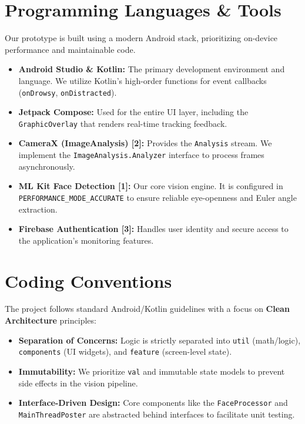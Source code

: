 \documentclass[11pt]{report}
\begin{document}
\section{Programming Languages \& Tools}\label{sec:prog-tools}

Our prototype is built using a modern Android stack, prioritizing on-device performance and maintainable code.

\begin{itemize}
    \item \textbf{Android Studio \& Kotlin:} The primary development environment and language. We utilize Kotlin's high-order functions for event callbacks (\texttt{onDrowsy}, \texttt{onDistracted}).
    \item \textbf{Jetpack Compose:} Used for the entire UI layer, including the \texttt{GraphicOverlay} that renders real-time tracking feedback.
    \item \textbf{CameraX (ImageAnalysis) [2]:} Provides the \texttt{Analysis} stream. We implement the \texttt{ImageAnalysis.Analyzer} interface to process frames asynchronously.
    \item \textbf{ML Kit Face Detection [1]:} Our core vision engine. It is configured in \texttt{PERFORMANCE\_MODE\_ACCURATE} to ensure reliable eye-openness and Euler angle extraction.
    \item \textbf{Firebase Authentication [3]:} Handles user identity and secure access to the application's monitoring features.
\end{itemize}

\section{Coding Conventions}\label{sec:coding-conventions}
The project follows standard Android/Kotlin guidelines with a focus on \textbf{Clean Architecture} principles:

\begin{itemize}
    \item \textbf{Separation of Concerns:} Logic is strictly separated into \texttt{util} (math/logic), \texttt{components} (UI widgets), and \texttt{feature} (screen-level state).
    \item \textbf{Immutability:} We prioritize \texttt{val} and immutable state models to prevent side effects in the vision pipeline.
    \item \textbf{Interface-Driven Design:} Core components like the \texttt{FaceProcessor} and \texttt{MainThreadPoster} are abstracted behind interfaces to facilitate unit testing.
\end{itemize}
\end{document}

